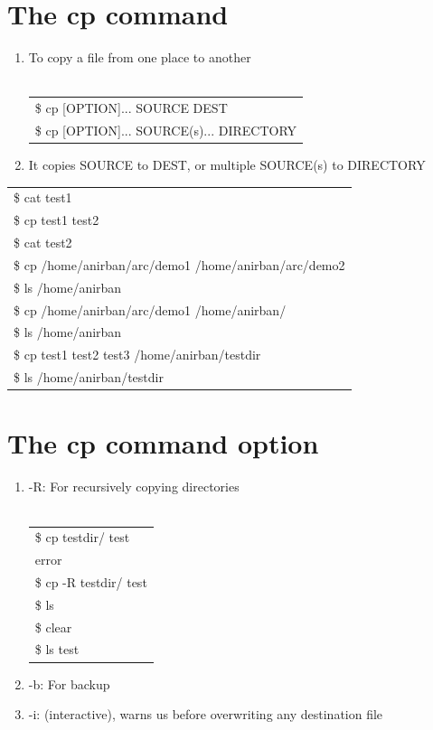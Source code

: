 \documentclass[12pt, a4paper]{report}
\begin{document}
\section{The cp command}
\begin{enumerate}
\item To copy a file from one place to another\\
\\
\begin{tabular}{|l|}\hline
\$ cp [OPTION]... SOURCE DEST\\
\$ cp [OPTION]... SOURCE(s)... DIRECTORY\\ \hline
\end{tabular}		
\item It copies SOURCE to DEST, or multiple SOURCE(s) to DIRECTORY
\end{enumerate}
\begin{tabular}{|l|}\hline
\$ cat test1\\
\$ cp test1 test2\\
\$ cat test2\\
\$ cp /home/anirban/arc/demo1 /home/anirban/arc/demo2\\
\$ ls /home/anirban\\
\$ cp /home/anirban/arc/demo1 /home/anirban/\\
\$ ls /home/anirban\\
\$ cp test1 test2 test3 /home/anirban/testdir\\
\$ ls /home/anirban/testdir\\ \hline
\end{tabular}
\section{The cp command option}
\begin{enumerate}
\item -R: For recursively copying directories\\
\\
\begin{tabular}{|l|} \hline
\$ cp testdir/ test\\
error\\
\$ cp -R testdir/ test\\
\$ ls\\
\$ clear\\
\$ ls test \\ \hline
\end{tabular}	
\item -b: For backup
\item -i: (interactive), warns us before overwriting any destination file
\end{enumerate}
\end{document}
